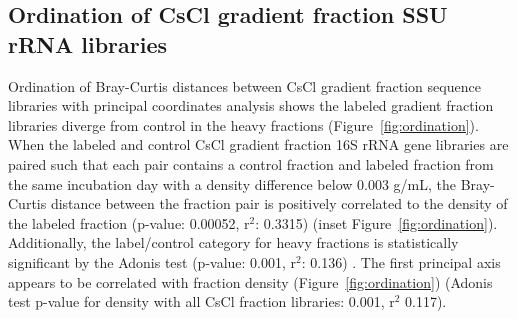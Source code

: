 \subsection{Ordination of CsCl gradient fraction SSU rRNA libraries} Ordination
of Bray-Curtis \citep{Bray_1957} distances between CsCl gradient fraction
sequence libraries with principal coordinates analysis shows the labeled
gradient fraction libraries diverge from control in the heavy fractions
(Figure~\ref{fig:ordination}). When the labeled and control CsCl gradient
fraction 16S rRNA gene libraries are paired such that each pair contains a
control fraction and labeled fraction from the same incubation day with a
density difference below 0.003 g/mL, the Bray-Curtis distance between the
fraction pair is positively correlated to the density of the labeled fraction
(p-value: 0.00052, r$^{2}$: 0.3315) (inset Figure~\ref{fig:ordination}).
Additionally, the label/control category for heavy fractions is statistically
significant by the Adonis test (p-value: 0.001, r$^{2}$: 0.136)
\citep{Anderson_2001}. The first principal axis appears to be correlated with
fraction density (Figure~\ref{fig:ordination}) (Adonis test p-value for density
with all CsCl fraction libraries: 0.001, r$^{2}$ 0.117).

